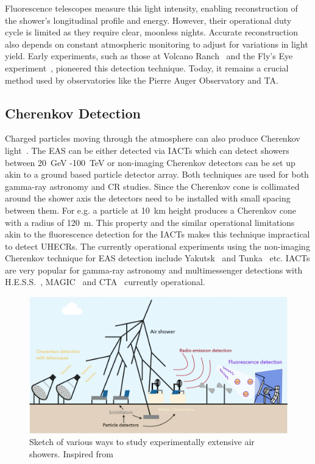 Fluorescence telescopes measure this light intensity, enabling reconstruction of the shower's longitudinal profile and energy. However, their operational duty cycle is limited as they require clear, moonless nights. Accurate reconstruction also depends on constant atmospheric monitoring to adjust for variations in light yield. Early experiments, such as those at Volcano Ranch~\cite{1977PhRvL..39..847B} and the Fly's Eye experiment~\cite{BALTRUSAITIS1985410,BALTRUSAITIS198887}, pioneered this detection technique. Today, it remains a crucial method used by observatories like the Pierre Auger Observatory and \gls{TA}.

\subsection{Cherenkov Detection}
\label{sec:EAS_cher}
Charged particles moving through the atmosphere can also produce Cherenkov light~\cite{Cherenkov:1934ilx}. The EAS can be either detected via \glspl{IACT} which can detect showers between 20 GeV -100 TeV or non-imaging Cherenkov detectors can be set up akin to a ground based particle detector array. Both techniques are used for both gamma-ray astronomy and CR studies. Since the Cherenkov cone is collimated around the shower axis the detectors need to be installed with small spacing between them. For e.g. a particle at 10 km height produces a Cherenkov cone with a radius of 120 m. This property and the similar operational limitations akin to the fluorescence detection for the IACTs makes this technique impractical to detect UHECRs. The currently operational experiments using the non-imaging Cherenkov technique for EAS detection include Yakutsk~\cite{DYAKONOV1986224} and Tunka~\cite{KUZMICHEV2020161830} etc. IACTs are very popular for gamma-ray astronomy and multimessenger detections with H.E.S.S.~\cite{Puhlhofer:2024fjx}, MAGIC~\cite{cortina2009technicalperformancemagictelescopes} and CTA~\cite{2018_CTAO} currently operational. 

\begin{figure}[t!]
    \centering
    \includegraphics[width=14.5cm]{thesis_figures/EAS/EAS-Detection-Techniques-mine.pdf}
    \caption{Sketch of various ways to study experimentally extensive air showers. Inspired from~\cite{article_2001_kampert}} 
    \label{fig:EAS_det_techniques}
\end{figure}

